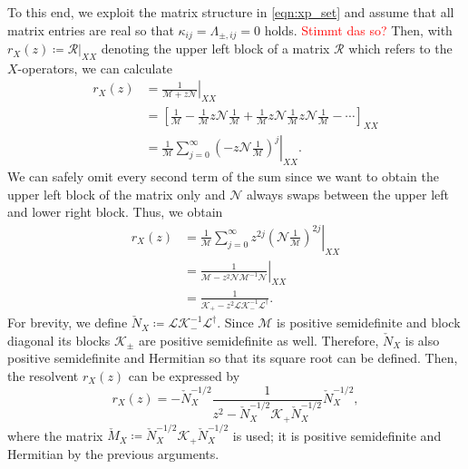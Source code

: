 \documentclass[
    reprint, 
    aps,
    preprintnumbers,
    twocolumn,
    prb,
    superscriptaddress
]{revtex4-2}
\newcommand{\mM}{\mathcal{M}}
\newcommand{\mN}{\mathcal{N}}
\newcommand{\bs}{\begin{subequations}}
\newcommand{\es}{\end{subequations}}
\newcommand{\red}[1]{\textcolor{red}{#1}}
\begin{document}
To this end, we exploit the matrix structure in \eqref{eqn:xp_set} and assume that all matrix entries are real so that $\kappa_{ij} = \Lambda_{\pm,ij} = 0$ holds. \red{Stimmt das so?}
Then, with $r_X(z)\coloneqq\mathcal{R}|_{XX}$ denoting the upper left block of a matrix $\mathcal{R}$ which 
refers to the $X$-operators, we can calculate
\bs
\begin{align}
    r_X (z) & = \left. \frac{1}{\mM + z \mN} \right\vert_{XX} \\
        &= \left[ \frac{1}{\mM} - \frac{1}{\mM} z \mN \frac{1}{\mM} + 
				\frac{1}{\mM} z \mN \frac{1}{\mM} z \mN \frac{1}{\mM} - \cdots \right]_{XX}  \\
        &= \left. \frac{1}{\mM} \sum_{j=0}^\infty \left( -z \mN \frac{1}{\mM} \right)^j \right\vert_{XX} .
\end{align}
\es
We can safely omit every second term of the sum since we want to obtain the upper left block of the matrix only
and $\mN$ always swaps between the upper left and lower right block. Thus, we obtain
\bs
\begin{align}
    r_X (z) &= \left. \frac{1}{\mM} \sum_{j=0}^\infty z^{2j} \left( \mN \frac{1}{\mM} \right)^{2j} \right\vert_{XX} 
		\\
        &= \left. \frac{1}{\mM - z^2 \mN \mM^{-1} \mN} \right\vert_{XX} 
				\\
        &= \frac{1}{\mathcal{K}_+ - z^2 \mathcal{L} \mathcal{K}_-^{-1} \mathcal{L}^\dagger}.
\end{align}
\es
For brevity, we define $\check{N}_X \coloneqq \mathcal{L} \mathcal{K}_-^{-1} \mathcal{L}^\dagger$.
Since $\mathcal{M}$ is positive semidefinite and block diagonal its blocks $\mathcal{K}_\pm$ are positive semidefinite as well.
Therefore, $\check{N}_X$ is also positive semidefinite and Hermitian so that its square root can be defined.
Then, the resolvent $r_X(z)$ can be expressed by
\begin{equation}
    \label{eqn:rx}
    r_X (z) = -\check{N}_X^{-1/2} \frac{1}{z^2 - \check{N}_X^{-1/2} \mathcal{K}_+ \check{N}_X^{-1/2}} 
		\check{N}_X^{-1/2},
\end{equation}
where the matrix $\check{M}_X \coloneqq \check{N}_X^{-1/2} \mathcal{K}_+ \check{N}_X^{-1/2}$ is used; it is
positive semidefinite and Hermitian by the previous arguments.
\end{document}
